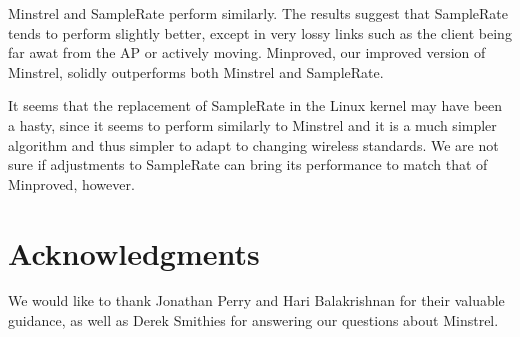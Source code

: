 \documentclass[twocolumn,10pt]{article}
\begin{document}
Minstrel and SampleRate perform similarly.  The results suggest that
SampleRate tends to perform slightly better, except in very lossy
links such as the client being far awat from the AP or actively
moving.  Minproved, our improved version of Minstrel, solidly
outperforms both Minstrel and SampleRate.

It seems that the replacement of SampleRate in the Linux kernel may
have been a hasty, since it seems to perform similarly to Minstrel and
it is a much simpler algorithm and thus simpler to adapt to changing
wireless standards.  We are not sure if adjustments to SampleRate can
bring its performance to match that of Minproved, however.

\section*{Acknowledgments} \label{sec:acknowledgments}

We would like to thank Jonathan Perry and Hari Balakrishnan for their
valuable guidance, as well as Derek Smithies for answering our
questions about Minstrel.



\end{document}
